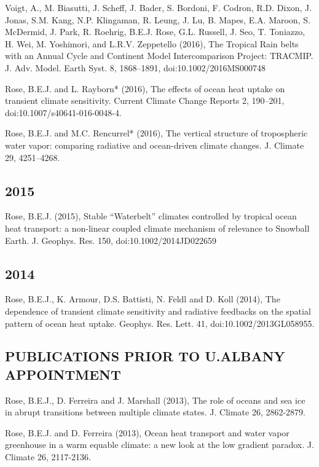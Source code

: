 \documentclass[11pt, letterpaper]{article} %
\newcommand{\years}[1]{\marginnote{\scriptsize #1}} %
\begin{document}
\years{2016}
  Voigt, A., M. Biasutti, J. Scheff, J. Bader, S. Bordoni, F. Codron,
  R.D. Dixon, J. Jonas, S.M. Kang, N.P. Klingaman, R. Leung, J. Lu, B.
  Mapes, E.A. Maroon, S. McDermid, J. Park, R. Roehrig, B.E.J. Rose,
  G.L. Russell, J. Seo, T. Toniazzo, H. Wei, M. Yoshimori, and L.R.V.
  Zeppetello (2016), The Tropical Rain belts with an Annual Cycle and
  Continent Model Intercomparison Project: TRACMIP. J. Adv. Model. Earth
  Syst. 8, 1868--1891, doi:10.1002/2016MS000748
 
\years{2016}  Rose, B.E.J. and L. Rayborn* (2016), The effects of ocean heat uptake on
  transient climate sensitivity. Current Climate Change Reports 2,
  190--201, doi:10.1007/s40641-016-0048-4.
   
\years{2016}  Rose, B.E.J. and M.C. Rencurrel* (2016), The vertical structure of
  tropospheric water vapor: comparing radiative and ocean-driven climate
  changes. J. Climate 29, 4251--4268.
 
\subsection*{2015}

\years{2015}  Rose, B.E.J. (2015), Stable ``Waterbelt'' climates controlled by tropical
  ocean heat transport: a non-linear coupled climate mechanism of
  relevance to Snowball Earth. J. Geophys. Res. 150,
  doi:10.1002/2014JD022659
  
\subsection*{2014}

\years{2014}  Rose, B.E.J., K. Armour, D.S. Battisti, N. Feldl and D. Koll (2014), The
  dependence of transient climate sensitivity and radiative feedbacks on
  the spatial pattern of ocean heat uptake. Geophys. Res. Lett. 41,
  doi:10.1002/2013GL058955.
  
\subsection*{PUBLICATIONS PRIOR TO U.ALBANY APPOINTMENT} 
 
\years{2013}  Rose, B.E.J., D. Ferreira and J. Marshall (2013), The role of oceans and
  sea ice in abrupt transitions between multiple climate states. J.
  Climate 26, 2862-2879.
    
\years{2013}  Rose, B.E.J. and D. Ferreira (2013), Ocean heat transport and water vapor
  greenhouse in a warm equable climate: a new look at the low gradient
  paradox. J. Climate 26, 2117-2136.
\end{document}
